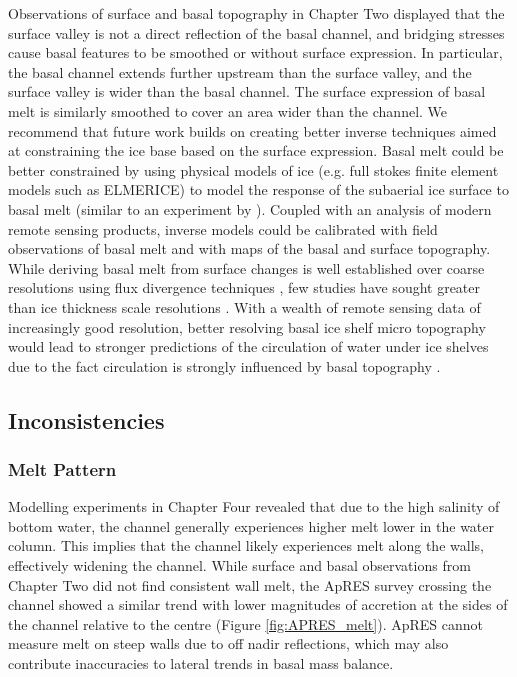 Observations of surface and basal topography in Chapter Two displayed that the surface valley is not a direct reflection of the basal channel, and bridging stresses cause basal features to be smoothed or without surface expression. In particular, the basal channel extends further upstream than the surface valley, and the surface valley is wider than the basal channel. The surface expression of basal melt is similarly smoothed to cover an area wider than the channel. 
We recommend that future work builds on creating better inverse techniques aimed at constraining the ice base based on the surface expression. Basal melt could be better constrained by using physical models of ice (e.g. full stokes finite element models such as ELMERICE) to model the response of the subaerial ice surface to basal melt (similar to an experiment by \cite{drews2020atmospheric}). Coupled with an analysis of modern remote sensing products, inverse models could be calibrated with field observations of basal melt and with maps of the basal and surface topography.  While deriving basal melt from surface changes is well established over coarse resolutions using flux divergence techniques \citep{berger2017detecting}, few studies have sought greater than ice thickness scale resolutions \citep[e.g.][]{mankoff2012role}. With a wealth of remote sensing data of increasingly good resolution, better resolving basal ice shelf micro topography would lead to stronger predictions of the circulation of water under ice shelves due to the fact circulation is strongly influenced by basal topography \citep{holland2003ice}. 

\subsection{Inconsistencies}

\subsubsection{Melt Pattern}

Modelling experiments in Chapter Four revealed that due to the high salinity of bottom water, the channel generally experiences higher melt lower in the water column. This implies that the channel likely experiences melt along the walls, effectively widening the channel. While surface and basal observations from Chapter Two did not find consistent wall melt, the ApRES survey crossing the channel showed a similar trend with lower magnitudes of accretion at the sides of the channel relative to the centre (Figure \ref{fig:APRES_melt}). ApRES cannot measure melt on steep walls due to off nadir reflections, which may also contribute inaccuracies to lateral trends in basal mass balance.

